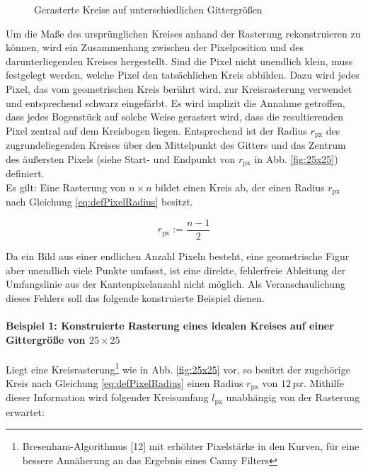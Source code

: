 \documentclass[accentcolor=tud1c, 11pt, toc=bib, toc=listof, captions=abovetable, parskip=half]{tudreport}
\begin{document}
\begin{figure}
    \centering
    
    \caption{Gerasterte Kreise auf unterschiedlichen Gittergrößen} 
    \label{fig:pic1-3}
\end{figure}

Um die Maße des ursprünglichen Kreises anhand der Rasterung rekonstruieren zu können, wird ein Zusammenhang zwischen der Pixelposition und des darunterliegenden Kreises hergestellt. Sind die Pixel nicht unendlich klein, muss festgelegt werden, welche Pixel den tatsächlichen Kreis abbilden. Dazu wird jedes Pixel, das vom geometrischen Kreis berührt wird, zur Kreisrasterung verwendet und entsprechend schwarz eingefärbt. Es wird implizit die Annahme getroffen, dass jedes Bogenstück auf solche Weise gerastert wird, dass die resultierenden Pixel zentral auf dem Kreisbogen liegen. Entsprechend ist der Radius $r_{\text{px}}$ des zugrundeliegenden Kreises über den Mittelpunkt des Gitters und das Zentrum des äußersten Pixels (siehe Start- und Endpunkt von  $r_{\text{px}}$ in Abb. \ref{fig:25x25}) definiert.\\

Es gilt: Eine Rasterung von $n \times n$ bildet einen Kreis ab, der einen Radius $r_{\text{px}}$ nach Gleichung \ref{eq:defPixelRadius} besitzt. 

\begin{equation} 
	r_{\text{px}} := \frac{n-1}{2}
\label{eq:defPixelRadius}
\end{equation}

Da ein Bild aus einer endlichen Anzahl Pixeln besteht, eine geometrische Figur aber unendlich viele Punkte umfasst, ist eine direkte, fehlerfreie Ableitung der Umfangslinie aus der Kantenpixelanzahl nicht möglich. Als Veranschaulichung dieses Fehlers soll das folgende konstruierte Beispiel dienen.

\paragraph{Beispiel 1: Konstruierte Rasterung eines idealen Kreises auf einer Gittergröße von $25\times25$}
Liegt eine Kreisrasterung\footnote{Bresenham-Algorithmus [12]  mit erhöhter Pixelstärke in den Kurven, für eine bessere Annäherung an das Ergebnis eines Canny Filters} wie in Abb. \ref{fig:25x25} vor, so besitzt der zugehörige Kreis nach Gleichung \ref{eq:defPixelRadius} einen Radius $r_{\text{px}}$ von $\SI{12}{px}$. Mithilfe dieser Information wird folgender Kreisumfang $l_{\text{px}}$ unabhängig von der Rasterung erwartet:
\end{document}
